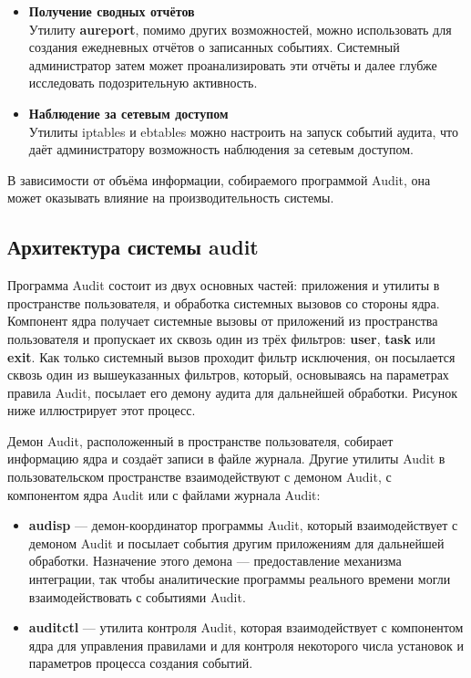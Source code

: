 \documentclass[a4paper,10pt,twoside]{article}
\begin{document}
\begin{itemize}
\item \textbf{Получение сводных отчётов}\\
Утилиту \textbf{aureport}, помимо других возможностей, можно использовать для создания ежедневных отчётов о записанных событиях. Системный администратор затем может проанализировать эти отчёты и далее глубже исследовать подозрительную активность.
\item \textbf{Наблюдение за сетевым доступом}\\
Утилиты iptables и ebtables можно настроить на запуск событий аудита, что даёт администратору возможность наблюдения за сетевым доступом.
\end{itemize}



В зависимости от объёма информации, собираемого программой Audit,  она может оказывать влияние на производительность системы.
⁠
\subsection{Архитектура системы audit}
Программа Audit состоит из двух основных частей: приложения и утилиты в пространстве пользователя, и обработка системных вызовов со стороны ядра. Компонент ядра получает системные вызовы от приложений из пространства пользователя и пропускает их сквозь один из трёх фильтров: \textbf{user}, \textbf{task} или \textbf{exit}. Как только системный вызов проходит фильтр исключения, он посылается сквозь один из вышеуказанных фильтров, который, основываясь на параметрах правила Audit, посылает его демону аудита для дальнейшей обработки. Рисунок ниже иллюстрирует этот процесс. 




Демон Audit, расположенный в пространстве пользователя, собирает информацию ядра и создаёт записи в файле журнала. Другие утилиты Audit в пользовательском пространстве взаимодействуют с демоном Audit, с компонентом ядра Audit или с файлами журнала Audit:   

\begin{itemize}
\item \textbf{audisp} — демон-координатор программы Audit, который взаимодействует с демоном Audit и посылает события другим приложениям для дальнейшей обработки. Назначение этого демона — предоставление механизма интеграции, так чтобы аналитические программы реального времени могли взаимодействовать с событиями Audit.
\item \textbf{auditctl} — утилита контроля Audit, которая взаимодействует с компонентом ядра для управления правилами и для контроля некоторого числа установок и параметров процесса создания событий.
\end{itemize}
\end{document}
